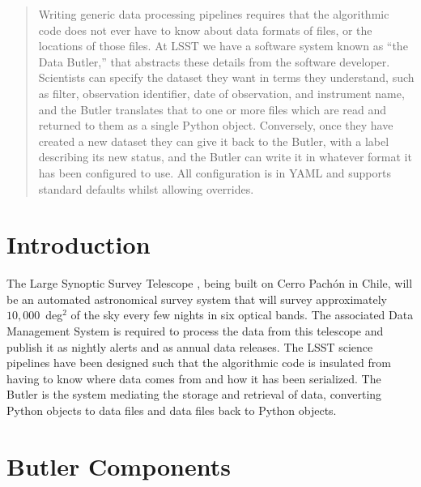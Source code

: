 \documentclass[11pt,twoside]{article}
\begin{document}
\begin{abstract}
  Writing generic data processing pipelines requires that the algorithmic code does not ever have to know about data formats of files, or the locations of those files.
  At LSST we have a software system known as ``the Data Butler,'' that abstracts these details from the software developer.
  Scientists can specify the dataset they want in terms they understand, such as filter, observation identifier, date of observation, and instrument name, and the Butler translates that to one or more files which are read and returned to them as a single Python object.
  Conversely, once they have created a new dataset they can give it back to the Butler, with a label describing its new status, and the Butler can write it in whatever format it has been configured to use.
  All configuration is in YAML and supports standard defaults whilst allowing overrides.
\end{abstract}

\section{Introduction}

The Large Synoptic Survey Telescope \citep{2008arXiv0805.2366I}, being built on Cerro Pach\'{o}n in Chile, will be an automated astronomical survey system that will survey approximately $10,000$~deg$^2$ of the sky every few nights in six optical bands.
The associated Data Management System \citep{2017ASPC..512..279J,2018AAS...23136210O} is required to process the data from this telescope and publish it as nightly alerts and as annual data releases.
The LSST science pipelines \citep[see for example][]{2018PASJ...70S...5B,I12-1_adassxxviii} have been designed such that the algorithmic code is insulated from having to know where data comes from and how it has been serialized.
The Butler is the system mediating the storage and retrieval of data, converting Python objects to data files and data files back to Python objects.

\section{Butler Components}
\end{document}
